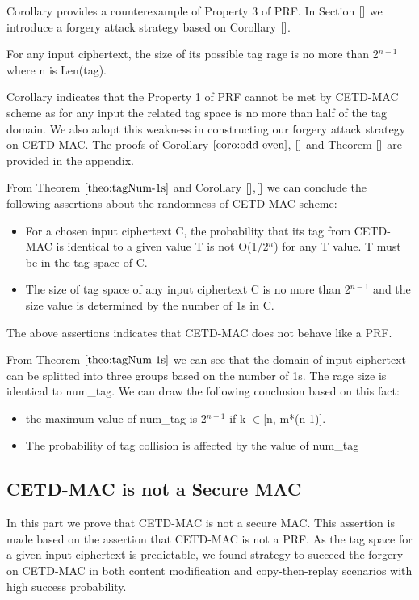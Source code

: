 Corollary provides a counterexample of Property 3 of PRF. In Section $\ref{}$ we introduce a forgery attack strategy based on Corollary $\ref{}$. 
\begin{corollary} \label{coro:max}
For any input ciphertext, the size of its possible tag rage is no more than 2$^{n-1}$ where n is Len(tag).
\end{corollary}
Corollary indicates that the Property 1 of PRF cannot be met by CETD-MAC scheme as for any input the related tag space is no more than half of the tag domain. We also adopt this weakness in constructing our forgery attack strategy on CETD-MAC.
The proofs of Corollary $\ref{coro:odd-even}$, $\ref{}$ and Theorem $\ref{}$ are provided in the appendix. 

From Theorem $\ref{theo:tagNum-1s}$ and Corollary $\ref{}$,$\ref{}$ we can conclude the following assertions about the randomness of CETD-MAC scheme:
\begin{itemize}
	\item For a chosen input ciphertext C, the probability that its tag from CETD-MAC is identical to a given value T is not O(1/2$^n$) for any T value. T must be in the tag space of C. 
	\item The size of tag space of any input ciphertext C is no more than 2$^{n-1}$ and the size value is determined by the number of 1s in C.
\end{itemize}
The above assertions indicates that CETD-MAC does not behave like a PRF.

From Theorem $\ref{theo:tagNum-1s}$ we can see that the domain of input ciphertext can be splitted into three groups based on the number of 1s. The rage size is identical to num\_tag. We can draw the following conclusion based on this fact:
\begin{itemize}
	\item the maximum value of num\_tag is 2$^{n-1}$ if k $\in$[n, m*(n-1)]. 
	\item The probability of tag collision is affected by the value of num\_tag
\end{itemize}

\subsection{CETD-MAC is not a Secure MAC}
In this part we prove that CETD-MAC is not a secure MAC. This assertion is made
based on the assertion that CETD-MAC is not a PRF. As the tag space for a given input ciphertext is predictable, we found strategy to succeed the forgery on CETD-MAC in both content modification and copy-then-replay scenarios with high success probability.

